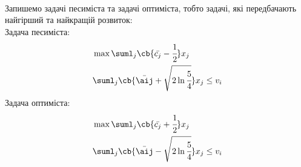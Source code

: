 \begin{tsk}
\begin{eqnarray}
\end{eqnarray}
Запишемо задачі песиміста та задачі оптиміста, тобто задачі, які передбачають найгірший та найкращій розвиток:\\
Задача песиміста:
\begin{eqnarray}
&\max \suml_{j} \cb{\bar{c_j} -\cfrac12} x_j\\
&\suml_j \cb{\bar{\aij} +\sqrt{2\ln\cfrac54}} x_j \leq v_i
\end{eqnarray}
Задача оптиміста:
\begin{eqnarray}
&\max \suml_{j} \cb{\bar{c_j} +\cfrac12} x_j\\
&\suml_j \cb{\bar{\aij} -\sqrt{2\ln\cfrac54}} x_j \leq v_i
\end{eqnarray}
\end{tsk}
 